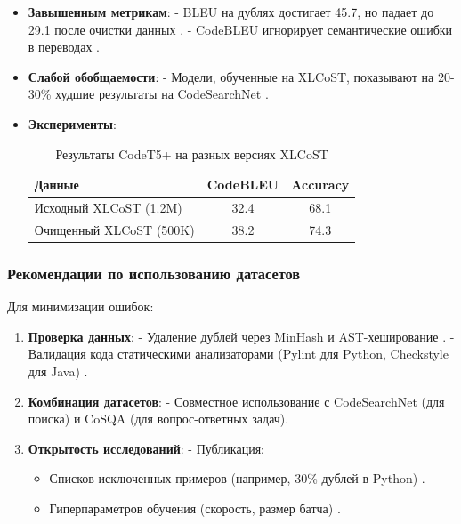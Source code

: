 \documentclass[14pt]{article}
\theoremstyle{definition}
\begin{document}
\begin{itemize}
    \item \textbf{Завышенным метрикам}:
    - BLEU на дублях достигает 45.7, но падает до 29.1 после очистки данных \cite{chen2023}.
    - CodeBLEU игнорирует семантические ошибки в переводах \cite{ren2021}.
    
    \item \textbf{Слабой обобщаемости}:
    - Модели, обученные на XLCoST, показывают на 20-30\% худшие результаты на CodeSearchNet \cite{husain2019codesearchnet}.
    
    \item \textbf{Эксперименты}:
    \begin{table}[h]
    \centering
    \begin{tabular}{|l|c|c|}
    \hline
    \textbf{Данные} & \textbf{CodeBLEU} & \textbf{Accuracy} \\ \hline
    Исходный XLCoST (1.2M) & 32.4 & 68.1 \\ \hline
    Очищенный XLCoST (500K) & 38.2 & 74.3 \\ \hline
    \end{tabular}
    \caption{Результаты CodeT5+ на разных версиях XLCoST \cite{wan2023codet5+}}
    \end{table}
\end{itemize}

\subsubsection{Рекомендации по использованию датасетов}
Для минимизации ошибок:

\begin{enumerate}
    \item \textbf{Проверка данных}:
    - Удаление дублей через MinHash и AST-хеширование \cite{allamanis2019adverse}.
    - Валидация кода статическими анализаторами (Pylint для Python, Checkstyle для Java) \cite{liu2022survey}.
    
    \item \textbf{Комбинация датасетов}:
    - Совместное использование с CodeSearchNet \cite{husain2019codesearchnet} (для поиска) и CoSQA \cite{zhang2020retrieval} (для вопрос-ответных задач).
    
    \item \textbf{Открытость исследований}:
    - Публикация:
    \begin{itemize}
        \item Списков исключенных примеров (например, 30\% дублей в Python) \cite{chen2023}.
        \item Гиперпараметров обучения (скорость, размер батча) \cite{feng2023}.
    \end{itemize}
\end{enumerate}
\end{document}
